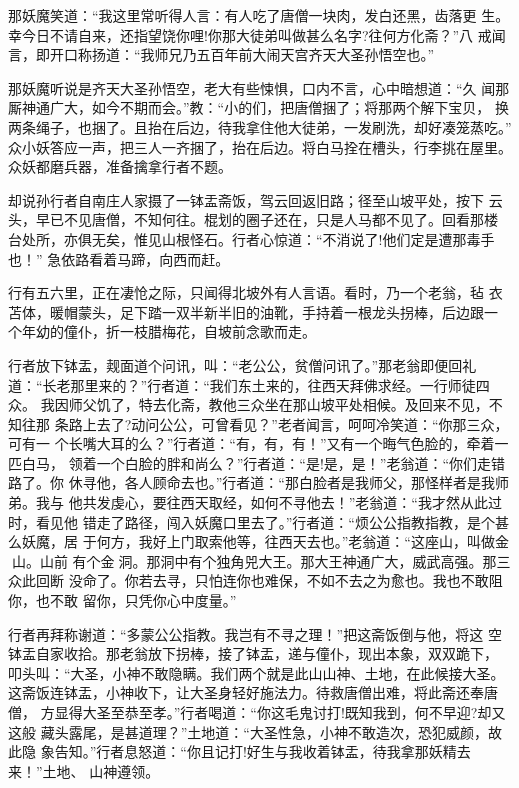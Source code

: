 那妖魔笑道：“我这里常听得人言：有人吃了唐僧一块肉，发白还黑，齿落更
生。幸今日不请自来，还指望饶你哩!你那大徒弟叫做甚么名字?往何方化斋？”八
戒闻言，即开口称扬道：“我师兄乃五百年前大闹天宫齐天大圣孙悟空也。”

那妖魔听说是齐天大圣孙悟空，老大有些悚惧，口内不言，心中暗想道：“久
闻那厮神通广大，如今不期而会。”教：“小的们，把唐僧捆了；将那两个解下宝贝，
换两条绳子，也捆了。且抬在后边，待我拿住他大徒弟，一发刷洗，却好凑笼蒸吃。”
众小妖答应一声，把三人一齐捆了，抬在后边。将白马拴在槽头，行李挑在屋里。
众妖都磨兵器，准备擒拿行者不题。

却说孙行者自南庄人家摄了一钵盂斋饭，驾云回返旧路；径至山坡平处，按下
云头，早已不见唐僧，不知何往。棍划的圈子还在，只是人马都不见了。回看那楼
台处所，亦俱无矣，惟见山根怪石。行者心惊道：“不消说了!他们定是遭那毒手也！”
急依路看着马蹄，向西而赶。

行有五六里，正在凄怆之际，只闻得北坡外有人言语。看时，乃一个老翁，毡
衣苫体，暖帽蒙头，足下踏一双半新半旧的油靴，手持着一根龙头拐棒，后边跟一
个年幼的僮仆，折一枝腊梅花，自坡前念歌而走。

行者放下钵盂，觌面道个问讯，叫：“老公公，贫僧问讯了。”那老翁即便回礼
道：“长老那里来的？”行者道：“我们东土来的，往西天拜佛求经。一行师徒四众。
我因师父饥了，特去化斋，教他三众坐在那山坡平处相候。及回来不见，不知往那
条路上去了?动问公公，可曾看见？”老者闻言，呵呵冷笑道：“你那三众，可有一
个长嘴大耳的么？”行者道：“有，有，有！”又有一个晦气色脸的，牵着一匹白马，
领着一个白脸的胖和尚么？”行者道：“是!是，是！”老翁道：“你们走错路了。你
休寻他，各人顾命去也。”行者道：“那白脸者是我师父，那怪样者是我师弟。我与
他共发虔心，要往西天取经，如何不寻他去！”老翁道：“我才然从此过时，看见他
错走了路径，闯入妖魔口里去了。”行者道：“烦公公指教指教，是个甚么妖魔，居
于何方，我好上门取索他等，往西天去也。”老翁道：“这座山，叫做金山。山前
有个金洞。那洞中有个独角兕大王。那大王神通广大，威武高强。那三众此回断
没命了。你若去寻，只怕连你也难保，不如不去之为愈也。我也不敢阻你，也不敢
留你，只凭你心中度量。”

行者再拜称谢道：“多蒙公公指教。我岂有不寻之理！”把这斋饭倒与他，将这
空钵盂自家收拾。那老翁放下拐棒，接了钵盂，递与僮仆，现出本象，双双跪下，
叩头叫：“大圣，小神不敢隐瞒。我们两个就是此山山神、土地，在此候接大圣。
这斋饭连钵盂，小神收下，让大圣身轻好施法力。待救唐僧出难，将此斋还奉唐僧，
方显得大圣至恭至孝。”行者喝道：“你这毛鬼讨打!既知我到，何不早迎?却又这般
藏头露尾，是甚道理？”土地道：“大圣性急，小神不敢造次，恐犯威颜，故此隐
象告知。”行者息怒道：“你且记打!好生与我收着钵盂，待我拿那妖精去来！”土地、
山神遵领。

